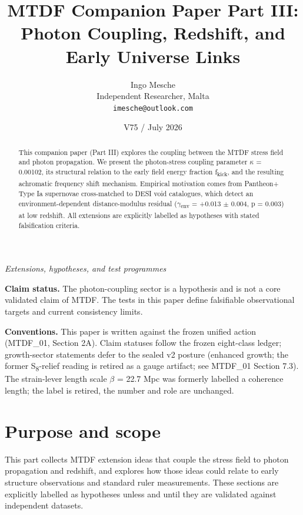\documentclass[11pt,a4paper]{article}
\title{MTDF Companion Paper Part III: Photon Coupling, Redshift, and Early Universe Links}
\author{Ingo Mesche\\ \small Independent Researcher, Malta \\ \small \texttt{imesche@outlook.com}}
\date{V75 / July 2026}
\begin{document}
\maketitle
\begin{center}\itshape Extensions, hypotheses, and test programmes\end{center}



\tableofcontents

\begin{abstract}
This companion paper (Part III) explores the coupling between the MTDF stress field and photon propagation. We present the photon-stress coupling parameter $\kappa$ = 0.00102, its structural relation to the early field energy fraction f\textsubscript{kick}, and the resulting achromatic frequency shift mechanism. Empirical motivation comes from Pantheon+ Type Ia supernovae cross-matched to DESI void catalogues, which detect an environment-dependent distance-modulus residual ($\gamma$\textsubscript{env} = +0.013 $\pm$ 0.004, p = 0.003) at low redshift. All extensions are explicitly labelled as hypotheses with stated falsification criteria.
\end{abstract}

\begin{mdframed}[linecolor=accent,linewidth=0.5pt,backgroundcolor=callout-bg,leftline=true,rightline=true,topline=true,bottomline=true,innerleftmargin=8pt,innerrightmargin=8pt,innertopmargin=6pt,innerbottommargin=6pt]
\textbf{Claim status.}
The photon-coupling sector is a hypothesis and is not a core validated claim of MTDF. The tests in this paper define falsifiable observational targets and current consistency limits.

\textbf{Conventions.} This paper is written against the frozen unified action (MTDF\_\allowbreak{}01, Section 2A). Claim statuses follow the frozen eight-class ledger; growth-sector statements defer to the sealed v2 posture (enhanced growth; the former S\textsubscript{8}-relief reading is retired as a gauge artifact; see MTDF\_\allowbreak{}01 Section 7.3). The strain-lever length scale $\beta$ = 22.7 Mpc was formerly labelled a coherence length; the label is retired, the number and role are unchanged.
\end{mdframed}


\section{Purpose and scope}
\label{sec:purpose}
This part collects MTDF extension ideas that couple the stress field to photon propagation and redshift, and explores how those ideas could relate to early structure observations and standard ruler measurements.
These sections are explicitly labelled as hypotheses unless and until they are validated against independent datasets.
\end{document}
